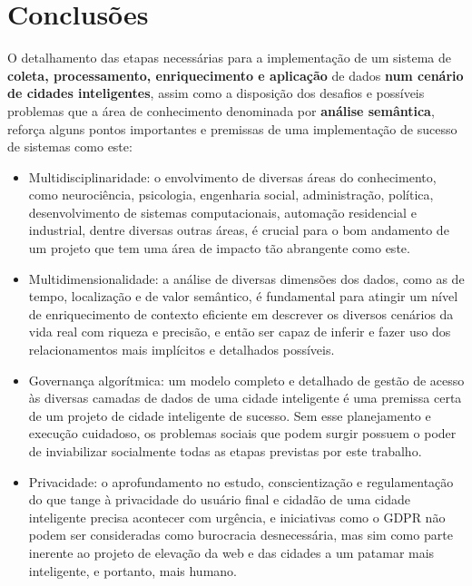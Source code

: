 \chapter{Conclusões} \label{c:conclusao}

O detalhamento das etapas necessárias para a implementação de um sistema de \textbf{coleta, processamento, enriquecimento e aplicação} de dados \textbf{num cenário de cidades inteligentes}, assim como a disposição dos desafios e possíveis problemas que a área de conhecimento denominada por \textbf{análise semântica}, reforça alguns pontos importantes e premissas de uma implementação de sucesso de sistemas como este:

\begin{itemize}
    \item Multidisciplinaridade: o envolvimento de diversas áreas do conhecimento, como neurociência, psicologia, engenharia social, administração, política, desenvolvimento de sistemas computacionais, automação residencial e industrial, dentre diversas outras áreas, é crucial para o bom andamento de um projeto que tem uma área de impacto tão abrangente como este.
    \item Multidimensionalidade: a análise de diversas dimensões dos dados, como as de tempo, localização e de valor semântico, é fundamental para atingir um nível de enriquecimento de contexto eficiente em descrever os diversos cenários da vida real com riqueza e precisão, e então ser capaz de inferir e fazer uso dos relacionamentos mais implícitos e detalhados possíveis.
    \item Governança algorítmica: um modelo completo e detalhado de gestão de acesso às diversas camadas de dados de uma cidade inteligente é uma premissa certa de um projeto de cidade inteligente de sucesso. Sem esse planejamento e execução cuidadoso, os problemas sociais que podem surgir possuem o poder de inviabilizar socialmente todas as etapas previstas por este trabalho.
    \item Privacidade: o aprofundamento no estudo, conscientização e regulamentação do que tange à privacidade do usuário final e cidadão de uma cidade inteligente precisa acontecer com urgência, e iniciativas como o GDPR não podem ser consideradas como burocracia desnecessária, mas sim como parte inerente ao projeto de elevação da web e das cidades a um patamar mais inteligente, e portanto, mais humano.
\end{itemize}